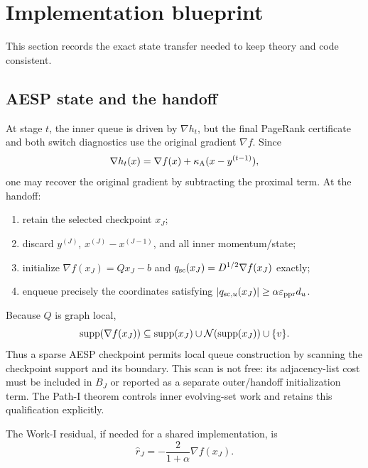\section{Implementation blueprint}
\label{sec:implementation}

This section records the exact state transfer needed to keep theory and code
consistent.

\subsection{AESP state and the handoff}

At stage $t$, the inner queue is driven by $\nabla h_t$, but the final PageRank
certificate and both switch diagnostics use the original gradient $\nabla f$.
Since
\begin{equation}
  \nabla h_t(x)
  =\nabla f(x)+\kappa_{\rm A}(x-y^{(t-1)}),
  \label{eq:inner-original-gradient}
\end{equation}
one may recover the original gradient by subtracting the proximal term. At the
handoff:
\begin{enumerate}[label=(\roman*),leftmargin=2em]
  \item retain the selected checkpoint $x_J$;
  \item discard $y^{(J)}$, $x^{(J)}-x^{(J-1)}$, and all inner momentum/state;
  \item initialize $\nabla f(x_J)=Qx_J-b$ and
        $q_{\rm sc}(x_J)=D^{1/2}\nabla f(x_J)$ exactly;
  \item enqueue precisely the coordinates satisfying
        $\left\lvert q_{{\rm sc},u}(x_J) \right\rvert\geq\alpha\varepsilon_{\mathrm{ppr}} d_u$.
\end{enumerate}

Because $Q$ is graph local,
\begin{equation}
  \operatorname{supp}(\nabla f(x_J))
  \subseteq
  \operatorname{supp}(x_J)\cup\mathcal N(\operatorname{supp}(x_J))\cup\{v\}.
  \label{eq:handoff-gradient-support}
\end{equation}
Thus a sparse AESP checkpoint permits local queue construction by scanning the
checkpoint support and its boundary. This scan is not free: its adjacency-list
cost must be included in $B_J$ or reported as a separate outer/handoff
initialization term. The Path-I theorem controls inner evolving-set work and
retains this qualification explicitly.

The Work-I residual, if needed for a shared implementation, is
\begin{equation}
  \widehat r_J=-\frac{2}{1+\alpha}\nabla f(x_J).
  \label{eq:handoff-residual-conversion}
\end{equation}

